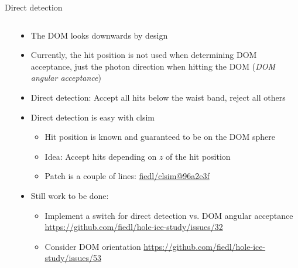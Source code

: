 
\begin{frame}[fragile]{Direct detection}

  \begin{columns}
    \begin{column}{0.5\textwidth}


    \end{column}
    \begin{column}{0.5\textwidth}

      \begin{itemize}
        \item The DOM looks downwards by design
        \item Currently, the hit position is not used when determining DOM acceptance, just the photon direction when hitting the DOM (\textit{DOM angular acceptance})
        \item Direct detection: Accept all hits below the waist band, reject all others
        \item Direct detection is easy with clsim
          \begin{itemize}
            \item Hit position is known and guaranteed to be on the DOM sphere
            \item Idea: Accept hits depending on $z$ of the hit position
            \item Patch is a couple of lines: \href{https://github.com/fiedl/clsim/commit/96a2e3fa1f9bb283b1b98f351e1a131b376a72b8}{fiedl/clsim@96a2e3f}
          \end{itemize}
        \item Still work to be done:
          \begin{itemize}
            \item Implement a switch for direct detection vs. DOM angular acceptance
                \tiny \url{https://github.com/fiedl/hole-ice-study/issues/32} \small
            \item Consider DOM orientation
                \tiny \url{https://github.com/fiedl/hole-ice-study/issues/53} \small
          \end{itemize}
      \end{itemize}


    \end{column}
  \end{columns}

\end{frame}

